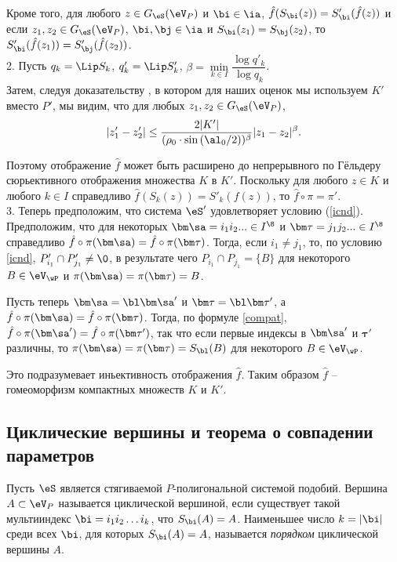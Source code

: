 Кроме того, для любого  $z\in G_\eS(\eV_P)$ и $\bi\in\ia$, $\hat f(S_\bi(z))=S'_\bi(\hat f(z))$ и\\ если $z_1,z_2\in G_\eS(\eV_P)$, $\bi,\bj\in\ia$ и $S_\bi(z_1)=S_\bj(z_2)$, то $S'_\bi(\hat f(z_1))=S'_\bj(\hat f(z_2))$.\\

2. Пусть $q_k = \Lip S_k$, $q_k' = \Lip S_k'$,  $\beta = \min \limits _{k\in I } {\dfrac {\log {q'_k}} {\log {q_k}}}$.\\

Затем, следуя доказательству \cite[Теорема 27, step 4.]{TSV0}, в котором для наших оценок мы используем $K'$ вместо $P'$, мы видим, что для любых $z_1,z_2\in G_\eS(\eV_P)$,
$$|z_1'-z_2'| \le\dfrac {2|K'|} {(\rho_0\cdot\sin {(\al_0/2)})^{\beta}}|z_1-z_2|^{\beta}.$$
   
Поэтому отображение $\hat f$ может быть расширено до непрерывного по Гёльдеру сюрьективного отображения множества $K$ в $K'$. Поскольку для любого $z\in K$ и любого $k\in I$ справедливо $\hat f(S_k(z))=S'_k(f(z))$, то $\hat f\circ\pi=\pi'$.\\
 
3. Теперь предположим, что система $\eS'$ удовлетворяет условию (\ref{icnd}). Предположим, что для некоторых $\bm\sa=i_1i_2...\in I^\8$ и $\bm\tau=j_1j_2...\in I^\8$ справедливо $\hat f\circ\pi(\bm\sa)=\hat f\circ\pi(\bm\tau)$. Тогда, если $i_1\neq j_1$, то, по условию \ref{icnd}, $P'_{i_1}\cap P'_{j_1}\neq\0$, в результате чего   $P_{i_1}\cap P_{j_1}=\{B\}$ для некоторого $B\in \eV_\wP$ и $\pi(\bm\sa)=\pi(\bm\tau)=B$.
 
Пусть теперь  $\bm\sa=\bl\bm\sa'$ и $\bm\tau=\bl\bm\tau'$, а $\hat f\circ\pi(\bm\sa)=\hat f\circ\pi(\bm\tau)$. Тогда, по формуле \ref{compat}, $\hat f\circ\pi(\bm\sa')=\hat f\circ\pi(\bm\tau')$, так что если первые индексы в $\bm\sa'$ и  $\bm\tau'$ различны, то $\pi(\bm\sa)=\pi(\bm\tau)=S_\bl(B)$ для некоторого $B\in \eV_\wP$. 
 
Это подразумевает иньективность отображения $\hat f$. Таким образом $\hat f$ -- гомеоморфизм компактных множеств $K$ и $K'$. \vse\\

\subsection{Циклические вершины и теорема о совпадении параметров}

\begin{definition}\label{cyclic}
Пусть $\eS$ является стягиваемой $P$-полигональной системой подобий.
Вершина $A \subset \eV_P$ называется циклической вершиной, если существует такой мультииндекс  $\bi=i_1 i_2 \ldots i_k$, что $S_\bi(A)=A$. 
Наименьшее число $k=|\bi|$ среди всех $\bi$, для которых $S_\bi(A)=A$, называется {\em порядком} циклической вершины $A$.
\end{definition}

